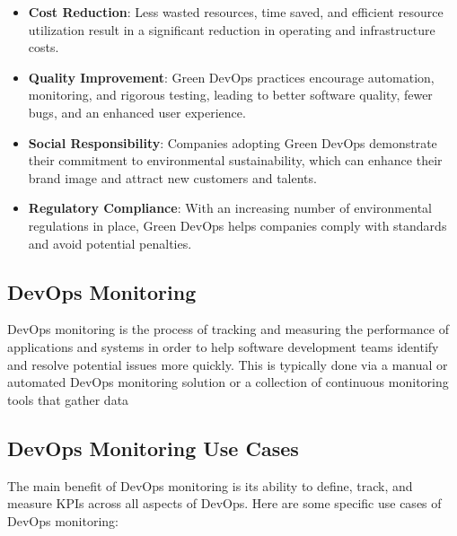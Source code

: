 \begin{itemize}
  \item \textbf{Cost Reduction}: Less wasted resources, time saved, and efficient resource utilization result in a significant reduction in operating and infrastructure costs.
  
  \item \textbf{Quality Improvement}: Green DevOps practices encourage automation, monitoring, and rigorous testing, leading to better software quality, fewer bugs, and an enhanced user experience.
  
  \item \textbf{Social Responsibility}: Companies adopting Green DevOps demonstrate their commitment to environmental sustainability, which can enhance their brand image and attract new customers and talents.
  
  \item \textbf{Regulatory Compliance}: With an increasing number of environmental regulations in place, Green DevOps helps companies comply with standards and avoid potential penalties.
\end{itemize}

\subsection{DevOps Monitoring}
DevOps monitoring is the process of tracking and measuring the performance of applications and systems in order to help software development teams identify and resolve potential issues more quickly. This is typically done via a manual or automated DevOps monitoring solution or a collection of continuous monitoring tools that gather data

\subsection*{DevOps Monitoring Use Cases}

The main benefit of DevOps monitoring is its ability to define, track, and measure KPIs across all aspects of DevOps. Here are some specific use cases of DevOps monitoring:

